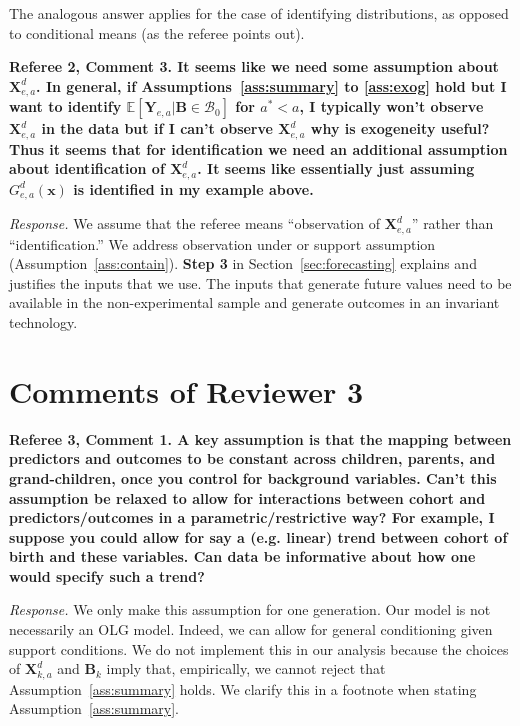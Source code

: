 The analogous answer applies for the case of identifying distributions, as opposed to conditional means (as the referee points out).

\noindent \textbf{Referee 2, Comment 3. It seems like we need some assumption about $\bm{X}_{e,a}^d$. In general, if Assumptions~\ref{ass:summary} to \ref{ass:exog} hold but I want to identify $\mathbb{E} \left[ \bm{Y}_{e,a} | \bm{B} \in \mathcal{B}_0 \right]$ for $a^* < a$, I typically won't observe $\bm{X}_{e,a}^d$ in the data but if I can't observe $\bm{X}_{e,a}^d$ why is exogeneity useful? Thus it seems that for identification we need an additional assumption about identification of $\bm{X}_{e,a}^d$. It seems like essentially just assuming $G_{e,a}^d \left( \bm{x} \right)$ is identified in my example above.} 

\noindent \textit{Response.} We assume that the referee means ``observation of $\bm{X}_{e,a}^d$'' rather than ``identification.'' We address observation under or support assumption (Assumption~\ref{ass:contain}). \textbf{Step 3} in Section~\ref{sec:forecasting} explains and justifies the inputs that we use. The inputs that generate future values need to be available in the non-experimental sample and generate outcomes in an invariant technology. 

\section*{Comments of Reviewer 3}

\noindent \textbf{Referee 3, Comment 1. A key assumption is that the mapping between predictors and outcomes to be constant across children, parents, and grand-children, once you control for background variables. Can't this assumption be relaxed to allow for interactions between cohort and predictors/outcomes in a parametric/restrictive way? For example, I suppose you could allow for say a (e.g. linear) trend between cohort of birth and these variables. Can data be informative about how one would specify such a trend?}

\noindent \textit{Response.} We only make this assumption for one generation. Our model is not necessarily an OLG model. Indeed, we can allow for general conditioning given support conditions. We do not implement this in our analysis because the choices of $\bm{X}_{k,a}^d$ and $\bm{B}_k$ imply that, empirically, we cannot reject that Assumption~\ref{ass:summary} holds. We clarify this in a footnote when stating Assumption~\ref{ass:summary}.

